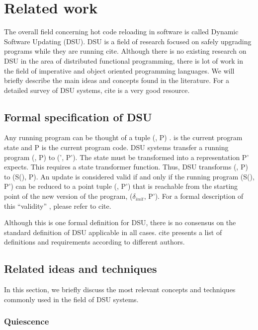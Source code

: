 \chapter{Related work}

The overall field concerning hot code reloading in software is called
Dynamic Software Updating (DSU). DSU is a field of research focused on
safely upgrading programs while they are running {cite}. Although
there is no existing research on DSU in the area of distributed
functional programming, there is lot of work in the field of
imperative and object oriented programming languages. We will briefly
describe the main ideas and concepts found in the literature. For a
detailed survey of DSU systems, {cite} is a very good resource.

\section{Formal specification of DSU}

Any running program can be thought of a tuple (\delta, P) . \delta is the
current program state and P is the current program code. DSU systems
transfer a running program (\delta, P) to (\delta', P'). The state
must be transformed into a representation P' expects. This requires a
state transformer function. Thus, DSU transforms (\delta, P) to
(S(\delta), P). An update is considered valid if and only if the
running program (S(\delta), P') can be reduced to a point tuple
(\delta, P') that is reachable from the starting point of the new
version of the program, ($\delta_{init}$, P').  For a formal
description of this ``validity'' , please refer to {cite}.

Although this is one formal definition for DSU, there is no consensus
on the standard definition of DSU applicable in all cases. {cite}
presents a list of definitions and requirements according to different
authors.

\section{Related ideas and techniques}

In this section, we briefly discuss the most relevant concepts and
techniques commonly used in the field of DSU systems.

\subsection{Quiescence}


